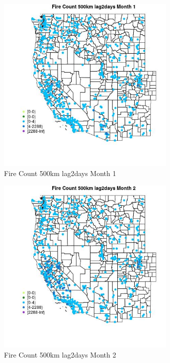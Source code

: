 \begin{figure} 
\centering  
\includegraphics[width=0.77\textwidth]{Code_Outputs/Report_ML_input_PM25_Step4_part_e_de_duplicated_aves_compiled_2019-05-21wNAs_MapObsMo1Fire_Count_500km_lag2days.jpg} 
\caption{\label{fig:Report_ML_input_PM25_Step4_part_e_de_duplicated_aves_compiled_2019-05-21wNAsMapObsMo1Fire_Count_500km_lag2days}Fire Count 500km lag2days Month 1} 
\end{figure} 
 

\begin{figure} 
\centering  
\includegraphics[width=0.77\textwidth]{Code_Outputs/Report_ML_input_PM25_Step4_part_e_de_duplicated_aves_compiled_2019-05-21wNAs_MapObsMo2Fire_Count_500km_lag2days.jpg} 
\caption{\label{fig:Report_ML_input_PM25_Step4_part_e_de_duplicated_aves_compiled_2019-05-21wNAsMapObsMo2Fire_Count_500km_lag2days}Fire Count 500km lag2days Month 2} 
\end{figure} 
 

